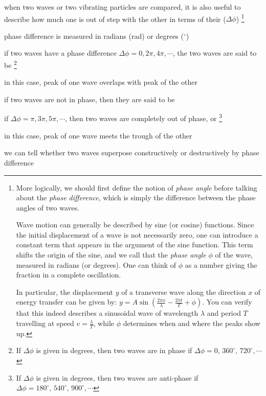 when two waves or two vibrating particles are compared, it is also useful to describe how much one is out of step with the other in terms of their  ($\Delta \phi$)
\footnote{More logically, we should first define the notion of \emph{phase angle} before talking about the \emph{phase difference}, which is simply the difference between the phase angles of two waves.
	
	Wave motion can generally be described by sine (or cosine) functions. Since the initial displacement of a wave is not necessarily zero, one can introduce a constant term that appears in the argument of the sine function. This term shifts the origin of the sine, and we call that the \emph{phase angle} $\phi$ of the wave, measured in radians (or degrees). One can think of $\phi$ as a number giving the fraction in a complete oscillation.
	
	In particular, the displacement $y$ of a transverse wave along the direction $x$ of energy transfer can be given by: $y = A \sin\left( \frac{2\pi x}{\lambda} - \frac{2\pi t}{T} + \phi \right)$. You can verify that this indeed describes a sinusoidal wave of wavelength $\lambda$ and period $T$ travelling at speed $v = \frac{\lambda}{T}$, while $\phi$ determines when and where the peaks show up.}

\cmt phase difference is measured in radians (rad) or degrees ($^\circ$)

\cmt if two waves have a phase difference $\Delta \phi = 0,2\pi,4\pi,\cdots$, the two waves are said to be \footnote{If $\Delta \phi$ is given in degrees, then two waves are in phase if $\Delta \phi = 0, \, 360^\circ, \, 720^\circ, \cdots$}

in this case, peak of one wave overlaps with peak of the other

\cmt if two waves are not in phase, then they are said to be 

\cmt if $\Delta \phi = \pi, 3\pi, 5\pi, \cdots$, then two waves are completely out of phase, or \footnote{If $\Delta \phi$ is given in degrees, then two waves are anti-phase if $\Delta \phi = 180^\circ, \, 540^\circ, \, 900^\circ, \cdots$}

in this case, peak of one wave meets the trough of the other


\cmt we can tell whether two waves superpose constructively or destructively by phase difference

